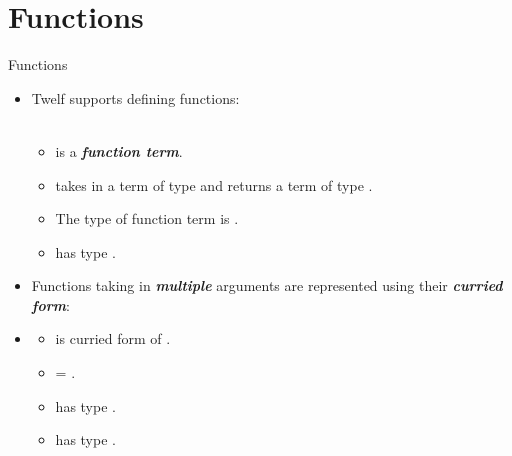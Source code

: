 \documentclass{beamer}
\renewcommand{\emph}[1]{\textbf{\textit{#1}}}
\begin{document}
\section{Functions}

\begin{frame}{Functions}
\begin{itemize}
\item Twelf supports defining functions: \\
 \;  \\

  \begin{itemize}
  \item {} is a \emph{function term}.
  \item {} takes in a term of type 
  and returns a term of type .
  \item The type of function term  is
  .
  \item {} has type .
  \end{itemize}

\pause
\item Functions taking in \emph{multiple} arguments
are represented using their \emph{curried form}:

\item {}

  \begin{itemize}
  \item {} is curried form
  of .
  \item {} = .
  \item {} has type .
  \item {} has type .
  \end{itemize}
\end{itemize}
\end{frame}
\end{document}
